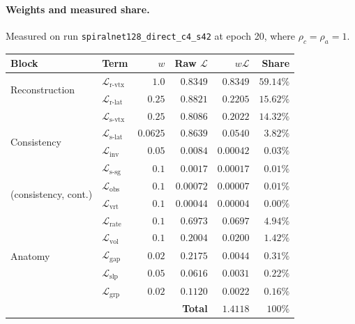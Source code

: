 \documentclass[11pt]{article}
\newcommand{\Loss}{\mathcal{L}}
\begin{document}
\paragraph{Weights and measured share.} Measured on run
\texttt{spiralnet128\_direct\_c4\_s42} at epoch 20, where $\rho_c = \rho_a = 1$.

\begin{center}
\begin{tabular}{llrrrr}
\toprule
Block & Term & $w$ & Raw $\Loss$ & $w\Loss$ & Share \\
\midrule
\multirow{2}{*}{Reconstruction}
 & $\Loss_{\mathrm{r\text{-}vtx}}$   & $1.0$    & $0.8349$ & $0.8349$ & $59.14\%$ \\
 & $\Loss_{\mathrm{r\text{-}lat}}$   & $0.25$   & $0.8821$ & $0.2205$ & $15.62\%$ \\
\midrule
\multirow{4}{*}{Consistency}
 & $\Loss_{\mathrm{s\text{-}vtx}}$   & $0.25$   & $0.8086$ & $0.2022$ & $14.32\%$ \\
 & $\Loss_{\mathrm{s\text{-}lat}}$   & $0.0625$ & $0.8639$ & $0.0540$ & $3.82\%$ \\
 & $\Loss_{\mathrm{inv}}$            & $0.05$   & $0.0084$ & $0.00042$ & $0.03\%$ \\
 & $\Loss_{\mathrm{s\text{-}sg}}$    & $0.1$    & $0.0017$ & $0.00017$ & $0.01\%$ \\
\midrule
\multirow{2}{*}{(consistency, cont.)}
 & $\Loss_{\mathrm{obs}}$            & $0.1$    & $0.00072$ & $0.00007$ & $0.01\%$ \\
 & $\Loss_{\mathrm{vrt}}$            & $0.1$    & $0.00044$ & $0.00004$ & $0.00\%$ \\
\midrule
\multirow{5}{*}{Anatomy}
 & $\Loss_{\mathrm{rate}}$           & $0.1$    & $0.6973$ & $0.0697$ & $4.94\%$ \\
 & $\Loss_{\mathrm{vol}}$            & $0.1$    & $0.2004$ & $0.0200$ & $1.42\%$ \\
 & $\Loss_{\mathrm{gap}}$            & $0.02$   & $0.2175$ & $0.0044$ & $0.31\%$ \\
 & $\Loss_{\mathrm{slp}}$            & $0.05$   & $0.0616$ & $0.0031$ & $0.22\%$ \\
 & $\Loss_{\mathrm{grp}}$            & $0.02$   & $0.1120$ & $0.0022$ & $0.16\%$ \\
\midrule
\multicolumn{4}{r}{\textbf{Total}} & $\bm{1.4118}$ & $100\%$ \\
\bottomrule
\end{tabular}
\end{center}
\end{document}
